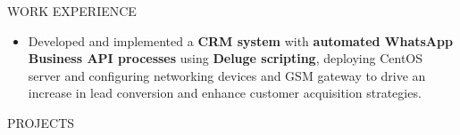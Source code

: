 \documentclass{resume} %
\begin{document}
\begin{rSection}{WORK EXPERIENCE}
\begin{itemize}
              \item Developed and implemented a \textbf{CRM system} with \textbf{automated WhatsApp Business API processes} using \textbf{Deluge scripting}, deploying CentOS server and configuring networking devices and GSM gateway to drive an increase in lead conversion and enhance customer acquisition strategies.
    \end{itemize}
\end{rSection}


\begin{rSection}{PROJECTS}



\end{rSection}
\end{document}
